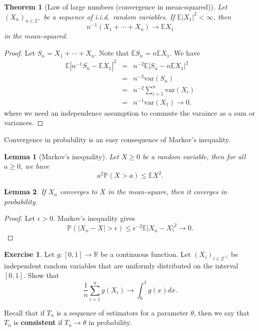 \documentclass[
]{article}
\newtheorem{theorem}{Theorem}[section]
\newtheorem{lemma}{Lemma}[section]
\theoremstyle{definition}
\theoremstyle{definition}
\theoremstyle{definition}
\newtheorem{exercise}{Exercise}[section]
\theoremstyle{remark}
\begin{document}
\begin{theorem}[Law of large numbers (convergence in mean-squared)]
\protect\hypertarget{thm:unnamed-chunk-2}{}{\label{thm:unnamed-chunk-2} \iffalse (Law of large numbers (convergence in mean-squared)) \fi{} }Let \((X_n)_{n \in \mathbb{Z}^{+}}\) be a sequence of i.i.d.~random variables. If \(\mathbb{E} |X_1|^2 < \infty\), then
\[ n^{-1}(X_1 + \cdots + X_n) \to \mathbb{E} X_1\]
in the mean-squared.
\end{theorem}

\begin{proof}
\iffalse{} {Proof. } \fi{}Let \(S_n = X_1 + \cdots + X_n\). Note that \(\mathbb{E} S_n = n \mathbb{E} X_1\). We have\\
\begin{eqnarray*}
\mathbb{E} | n^{-1}S_n - \mathbb{E} X_1 |^2 &=&  n^{-2}\mathbb{E} | S_n - n\mathbb{E} X_1 |^2 \\
&=&  n^{-2}\mathrm{var}(S_n)  \\
&=&  n^{-2} \sum_{i=1} ^n \mathrm{var}(X_i)  \\
&=&  n^{-1}  \mathrm{var}(X_1) \to 0, 
\end{eqnarray*}
where we need an independence assumption to commute the varaince as a sum or variances.
\end{proof}

Convergence in probability is an easy consequence of Markov's inequality.

\begin{lemma}[Markov's inequality]
\protect\hypertarget{lem:unnamed-chunk-4}{}{\label{lem:unnamed-chunk-4} \iffalse (Markov's inequality) \fi{} }Let \(X \geq 0\) be a random variable, then for all \(a \geq 0\), we have
\[ a^2\mathbb{P} ( X > a ) \leq \mathbb{E} X^2.\]
\end{lemma}
\begin{lemma}
\protect\hypertarget{lem:unnamed-chunk-5}{}{\label{lem:unnamed-chunk-5} }If \(X_n\) converges to \(X\) in the mean-square, then it coverges in probability.
\end{lemma}
\begin{proof}
\iffalse{} {Proof. } \fi{}Let \(\epsilon >0\). Markov's inequality gives
\[\mathbb{P} (| X_n - X| > \epsilon) \leq  \epsilon^{-2} \mathbb{E} | X_n -X|^2 \to 0.\]
\end{proof}
\begin{exercise}
\protect\hypertarget{exr:unnamed-chunk-7}{}{\label{exr:unnamed-chunk-7} }Let \(g: [0,1] \to \mathbb{R}\) be a continuous function. Let \((X_i)_{i \in \mathbb{Z}^{+]}}\) be independent random variables that are uniformly distributed on the interval \([0,1]\). Show that
\[ \frac{1}{n}\sum_{i=1} ^ n g(X_i) \to \int_0 ^1 g(x) dx.\]
\end{exercise}
Recall that if \(T_n\) is a sequence of estimators for a parameter \(\theta\), then we say that \(T_n\) is \textbf{consistent} if \(T_n \to \theta\) in probability.
\end{document}
